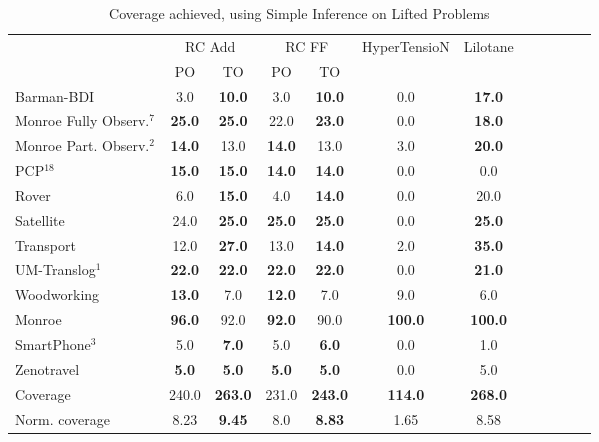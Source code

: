 \documentclass[letterpaper]{article} %
\begin{document}
\begin{table}
	\centering
	\caption{Coverage achieved, using Simple Inference on Lifted Problems}
	\label{table:LiftedSimpleCoverage}
	\scalebox{0.65} {
		\begin{tabular}{lccccccccccl} 
			\toprule 
			& \multicolumn{2}{c}{RC Add} & \multicolumn{2}{c}{RC FF} & HyperTensioN & Lilotane \\ 
			\cmidrule(lr){2-3} \cmidrule(lr){4-5}  
			&PO & TO & PO & TO  \\ 
			\midrule 
			Barman-BDI & 3.0 & \textbf{10.0} & 3.0 & \textbf{10.0} & 0.0 & \textbf{17.0}  \\ 
			Monroe Fully Observ.$^{7}$ & \textbf{25.0} & \textbf{25.0} & 22.0 & \textbf{23.0} & 0.0 & \textbf{18.0}   \\ 
			Monroe Part. Observ.$^{2}$ & \textbf{14.0} & 13.0 & \textbf{14.0} & 13.0 & 3.0 & \textbf{20.0}   \\ 
			PCP$^{18}$ & \textbf{15.0} & \textbf{15.0} & \textbf{14.0} & \textbf{14.0} & 0.0 & 0.0   \\ 
			Rover & 6.0 & \textbf{15.0} & 4.0 & \textbf{14.0} & 0.0 & 20.0   \\ 
			Satellite & 24.0 & \textbf{25.0} & \textbf{25.0} & \textbf{25.0} & 0.0 & \textbf{25.0}   \\ 
			Transport & 12.0 & \textbf{27.0} & 13.0 & \textbf{14.0} & 2.0 & \textbf{35.0}   \\ 
			UM-Translog$^{1}$ & \textbf{22.0} & \textbf{22.0} & \textbf{22.0} & \textbf{22.0} & 0.0 & \textbf{21.0}   \\ 
			Woodworking & \textbf{13.0} & 7.0 & \textbf{12.0} & 7.0 & 9.0 & 6.0  \\ 
			\midrule
			Monroe & \textbf{96.0} & 92.0 & \textbf{92.0} & 90.0 & \textbf{100.0} & \textbf{100.0}  \\ 
			SmartPhone$^{3}$ & 5.0 & \textbf{7.0} & 5.0 & \textbf{6.0} & 0.0 & 1.0  \\ 
			Zenotravel & \textbf{5.0} & \textbf{5.0} & \textbf{5.0} & \textbf{5.0} & 0.0 & 5.0  \\ 
			\midrule 
			Coverage & 240.0 & \textbf{263.0} & 231.0 & \textbf{243.0} & \textbf{114.0} & \textbf{268.0}  \\ 
			Norm. coverage & 8.23 & \textbf{9.45} & 8.0 & \textbf{8.83} & 1.65 & 8.58  \\ 
			\bottomrule 
		\end{tabular} 
		
	}
\end{table}
\end{document}
